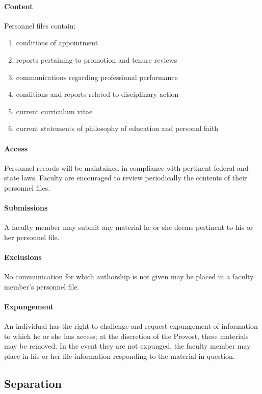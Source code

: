\documentclass[letterpaper, 11pt]{article}
\begin{document}
			\paragraph{Content}
				Personnel files contain:
				\begin{enumerate}[label=\alph*)]
					\item{conditions of appointment}
					\item{reports pertaining to promotion and tenure reviews}
					\item{communications regarding professional performance}
					\item{conditions and reports related to disciplinary action}
					\item{current curriculum vitae}
					\item{current statements of philosophy of education and personal faith}
				\end{enumerate}
			\paragraph{Access}
				Personnel records will be maintained in compliance with pertinent federal and state laws.  Faculty are encouraged to review periodically the contents of their personnel files.
			\paragraph{Submissions}
				A faculty member may submit any material he or she deems pertinent to his or her personnel file.
			\paragraph{Exclusions}
				No communication for which authorship is not given may be placed in a faculty member's personnel file.
			\paragraph{Expungement}
				An individual has the right to challenge and request expungement of information to which he or she has access; at the discretion of the Provost, these materials may be removed.  In the event they are not expunged, the faculty member may place in his or her file information responding to the material in question.
	\subsection{Separation}
\end{document}
